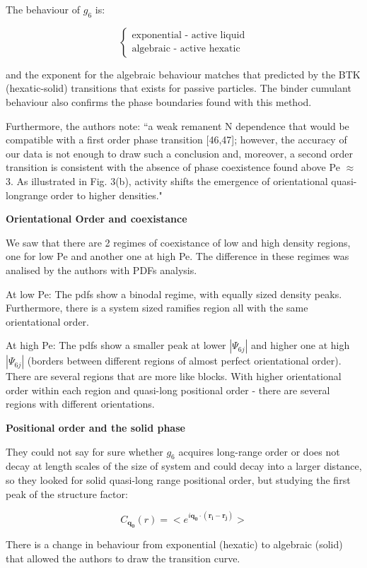 \documentclass[a4paper]{article}
\begin{document}
The behaviour of $g_6$ is:

$$
\begin{cases}
	\text{exponential - active liquid}\\
	\text{algebraic - active hexatic}
\end{cases}
$$

and the exponent for the algebraic behaviour matches that predicted by the BTK (hexatic-solid) transitions that exists for passive particles. The binder cumulant behaviour also confirms the phase boundaries found with this method.

Furthermore, the authors note: ``a weak remanent N dependence that would be compatible with a first order phase transition [46,47]; however, the accuracy of our data is not enough to draw such a conclusion and, moreover, a second order transition is consistent with the absence of phase coexistence found above Pe $\approx$ 3. As illustrated in Fig. 3(b), activity shifts the emergence of orientational quasi-longrange order to higher densities."

\textbf{Orientational Order and coexistance}

We saw that there are 2 regimes of coexistance of low and high density regions, one for low Pe and another one at high Pe. The difference in these regimes was analised by the authors with PDFs analysis.

At low Pe: The pdfs show a binodal regime, with equally sized density peaks. Furthermore, there is a system sized ramifies region all with the same orientational order.

At high Pe: The pdfs show a smaller peak at lower $|\Psi_{6j}|$ and higher one at high $|\Psi_{6j}|$ (borders between different regions of almost perfect orientational order). There are several regions that are more like blocks. With higher orientational order within each region and quasi-long positional order - there are several regions with different orientations.

\textbf{Positional order and the solid phase}

They could not say for sure whether $g_6$ acquires long-range order or does not decay at length scales of the size of system and could decay into a larger distance, so they looked for solid quasi-long range positional order, but studying the first peak of the structure factor:

$$
C_\mathbf{q_0}(r) = <e^{i\mathbf{q_0\cdot (r_i-r_j)}}>
$$

There is a change in behaviour from exponential (hexatic) to algebraic (solid) that allowed the authors to draw the transition curve.
\end{document}
